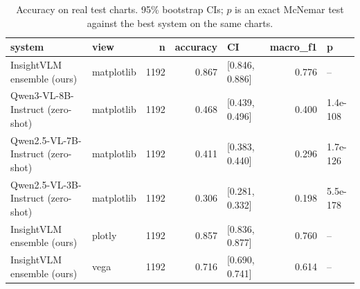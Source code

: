 \begin{table}
\caption{Accuracy on real test charts. 95\% bootstrap CIs; $p$ is an exact McNemar test against the best system on the same charts.}
\label{tab:real}
\begin{tabular}{llrrlrl}
\toprule
system & view & n & accuracy & CI & macro_f1 & p \\
\midrule
InsightVLM ensemble (ours) & matplotlib & 1192 & 0.867 & [0.846, 0.886] & 0.776 & -- \\
Qwen3-VL-8B-Instruct (zero-shot) & matplotlib & 1192 & 0.468 & [0.439, 0.496] & 0.400 & 1.4e-108 \\
Qwen2.5-VL-7B-Instruct (zero-shot) & matplotlib & 1192 & 0.411 & [0.383, 0.440] & 0.296 & 1.7e-126 \\
Qwen2.5-VL-3B-Instruct (zero-shot) & matplotlib & 1192 & 0.306 & [0.281, 0.332] & 0.198 & 5.5e-178 \\
InsightVLM ensemble (ours) & plotly & 1192 & 0.857 & [0.836, 0.877] & 0.760 & -- \\
InsightVLM ensemble (ours) & vega & 1192 & 0.716 & [0.690, 0.741] & 0.614 & -- \\
\bottomrule
\end{tabular}
\end{table}
